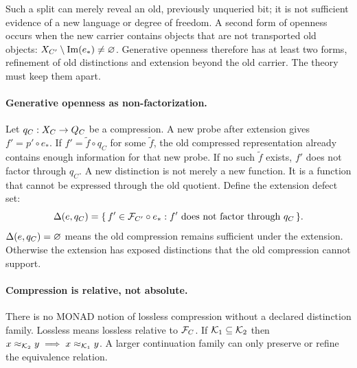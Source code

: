 
Such a split can merely reveal an old, previously unqueried bit; it is
not sufficient evidence of a new language or degree of freedom.
A second form of openness occurs when
the new carrier contains objects that are not transported old objects:
$X_{C'} \setminus \operatorname{Im}(e_*) \neq \varnothing$.
Generative openness therefore has at least two forms, refinement of
old distinctions and extension beyond the old carrier. The theory
must keep them apart.

\paragraph{Generative openness as non-factorization.}

Let $q_C : X_{C} \to Q_C$ be a compression. A new probe after
extension gives $f' = p' \circ e_*$. If $f' = \tilde f \circ q_C$ for
some $\tilde f$, the old compressed representation already contains
enough information for that new probe. If no such $\tilde f$ exists,
$f'$ does not factor through $q_C$. A new distinction is not merely a
new function. It is a function that cannot be expressed through the
old quotient. Define the extension defect set:
\begin{equation}
  \Delta(e, q_C)
  = \{\, f' \in \mathcal{F}_{C'} \circ e_* :
     f' \text{ does not factor through } q_C \,\}.\label{eq:defect}
\end{equation}
$\Delta(e, q_C) = \varnothing$ means the old compression remains
sufficient under the extension. Otherwise the extension has exposed
distinctions that the old compression cannot support.



\paragraph{Compression is relative, not absolute.}

There is no MONAD notion of lossless compression without a declared
distinction family. Lossless means lossless relative to
$\mathcal{F}_{C}$. If $\mathcal{K}_{1} \subseteq \mathcal{K}_{2}$ then
$x \approx_{\mathcal{K}_{2}} y \implies x \approx_{\mathcal{K}_{1}} y$. A larger
continuation family can only preserve or refine the equivalence
relation.


